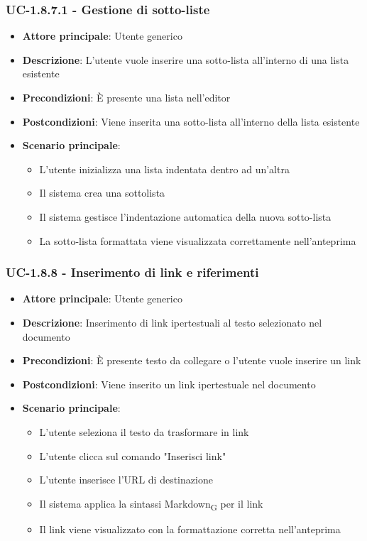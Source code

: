 \documentclass[11pt,a4paper]{article}
\newcommand{\gls}[1]{#1\textsubscript{G}}
\begin{document}
\subsubsection{UC-1.8.7.1 - Gestione di sotto-liste}
\begin{itemize}
    \item \textbf{Attore principale}: Utente generico
    \item \textbf{Descrizione}: L'utente vuole inserire una sotto-lista all'interno di una lista esistente
    \item \textbf{Precondizioni}: È presente una lista nell'editor
    \item \textbf{Postcondizioni}: Viene inserita una sotto-lista all'interno della lista esistente
    \item \textbf{Scenario principale}:
        \begin{itemize}
            \item L'utente inizializza una lista indentata dentro ad un'altra
            \item Il sistema crea una sottolista
            \item Il sistema gestisce l'indentazione automatica della nuova sotto-lista
            \item La sotto-lista formattata viene visualizzata correttamente nell'anteprima
        \end{itemize}
\end{itemize}

\subsubsection{UC-1.8.8 - Inserimento di link e riferimenti}
\begin{itemize}
    \item \textbf{Attore principale}: Utente generico
    \item \textbf{Descrizione}: Inserimento di link ipertestuali al testo selezionato nel documento
    \item \textbf{Precondizioni}: È presente testo da collegare o l'utente vuole inserire un link
    \item \textbf{Postcondizioni}: Viene inserito un link ipertestuale nel documento
    \item \textbf{Scenario principale}:
        \begin{itemize}
            \item L'utente seleziona il testo da trasformare in link
            \item L'utente clicca sul comando "Inserisci link"
            \item L'utente inserisce l'URL di destinazione
            \item Il sistema applica la sintassi \gls{Markdown} per il link
            \item Il link viene visualizzato con la formattazione corretta nell'anteprima
        \end{itemize}
\end{itemize}
\end{document}
